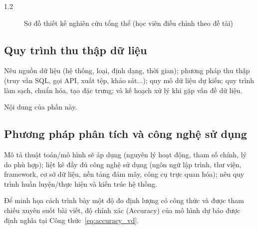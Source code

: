 \begin{spacing}{1.2}
\begin{figure}[htpb]
\centering
{}
\caption{Sơ đồ thiết kế nghiên cứu tổng thể (học viên điều chỉnh theo đề tài)}
\label{fig:thiet_ke_nc}
\end{figure}

\subsection{Quy trình thu thập dữ liệu}
\label{subsec:thu_thap_du_lieu}

\begin{huongdan}
Nêu nguồn dữ liệu (hệ thống, loại, định dạng, thời gian); phương pháp thu thập (truy vấn SQL, gọi API, xuất tệp, khảo sát...); quy mô dữ liệu dự kiến; quy trình làm sạch, chuẩn hóa, tạo đặc trưng; và kế hoạch xử lý khi gặp vấn đề dữ liệu.
\end{huongdan}

Nội dung của phần này.

\subsection{Phương pháp phân tích và công nghệ sử dụng}
\label{subsec:phan_tich_cong_nghe}

\begin{huongdan}
Mô tả thuật toán/mô hình sẽ áp dụng (nguyên lý hoạt động, tham số chính, lý do phù hợp); liệt kê đầy đủ công nghệ sử dụng (ngôn ngữ lập trình, thư viện, framework, cơ sở dữ liệu, nền tảng đám mây, công cụ trực quan hóa); nêu quy trình huấn luyện/thực hiện và kiến trúc hệ thống.
\end{huongdan}

Để minh họa cách trình bày một độ đo định lượng có công thức và được tham chiếu xuyên suốt bài viết, độ chính xác (Accuracy) của mô hình dự báo được định nghĩa tại Công thức~\eqref{eq:accuracy_vd}.


\end{spacing}
